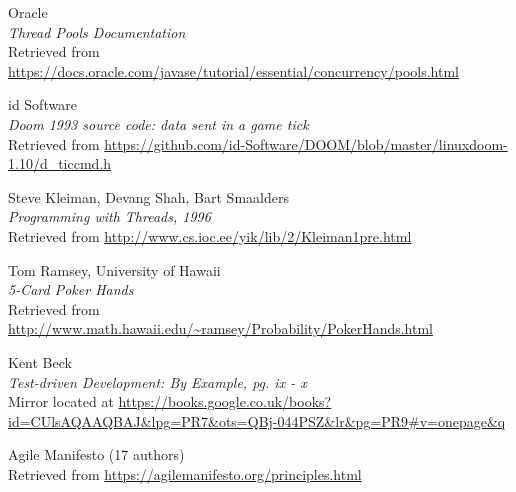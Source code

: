 \documentclass[11pt]{article}
\begin{document}
\begin{thebibliography}{9}
\hypertarget{threadpool}{}
\begin{flushleft}
	Oracle \\
	\textit{Thread Pools Documentation} \\
	Retrieved from \url{https://docs.oracle.com/javase/tutorial/essential/concurrency/pools.html}
\end{flushleft}

\hypertarget{doom_network}{}
\begin{flushleft}
	id Software \\
	\textit{Doom 1993 source code: data sent in a game tick} \\
	Retrieved from \url{https://github.com/id-Software/DOOM/blob/master/linuxdoom-1.10/d_ticcmd.h}
\end{flushleft}

\hypertarget{client_server}{}
\begin{flushleft}
	Steve Kleiman, Devang Shah, Bart Smaalders \\
	\textit{Programming with Threads, 1996} \\
	Retrieved from \url{http://www.cs.ioc.ee/yik/lib/2/Kleiman1pre.html}
\end{flushleft}

\hypertarget{str_uncommon}{}
\begin{flushleft}
	Tom Ramsey, University of Hawaii \\
	\textit{5-Card Poker Hands} \\
	Retrieved from \url{http://www.math.hawaii.edu/~ramsey/Probability/PokerHands.html}
\end{flushleft}

\begin{flushleft}
	Kent Beck \\
	\textit{Test-driven Development: By Example, pg. ix - x} \\
	Mirror located at \url{https://books.google.co.uk/books?id=CUlsAQAAQBAJ&lpg=PR7&ots=QBj-044PSZ&lr&pg=PR9#v=onepage&q}
\end{flushleft}

\begin{flushleft}
	Agile Manifesto (17 authors) \\
	Retrieved from \url{https://agilemanifesto.org/principles.html}
\end{flushleft}




\end{thebibliography}
\end{document}
